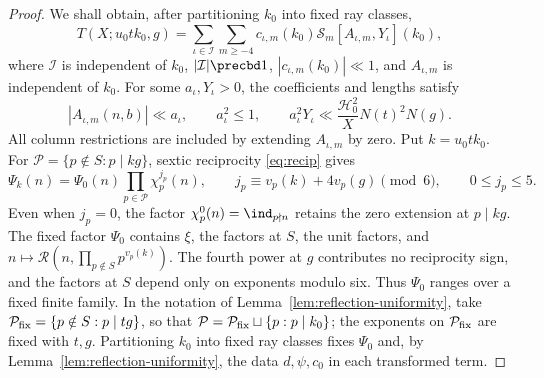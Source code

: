 \begin{proof}
We shall obtain, after partitioning $k_0$ into fixed ray classes,
\[
 T(X;u_0tk_0,g)
 =\sum_{\iota\in\mathcal I}\sum_{m\ge-4}
 c_{\iota,m}(k_0)\mathscr S_m[A_{\iota,m},Y_\iota](k_0),
\]
where $\mathcal I$ is independent of $k_0$, $|\mathcal I|\precbd1$,
$|c_{\iota,m}(k_0)|\ll1$, and $A_{\iota,m}$ is independent of $k_0$.
For some $a_\iota,Y_\iota>0$, the coefficients and lengths satisfy
\begin{equation}\label{eq:auxiliary-conductor-bound}
 |A_{\iota,m}(n,b)|\ll a_\iota,\qquad
 a_\iota^2\le1,\qquad
 a_\iota^2Y_\iota\ll
 \frac{\mathcal H_0^2}{X}N(t)^2N(g).
\end{equation}
All column restrictions are included by extending $A_{\iota,m}$ by zero.
Put $k=u_0tk_0$. For $\mathcal P=\{p\notin S:p\mid kg\}$, sextic
reciprocity \eqref{eq:recip} gives
\begin{equation}\label{eq:theta-row-twist}
 \Psi_k(n)=\Psi_0(n)\prod_{p\in\mathcal P}\chi_p^{j_p}(n),
 \qquad j_p\equiv v_p(k)+4v_p(g)\pmod6,
 \qquad 0\le j_p\le5.
\end{equation}
Even when $j_p=0$, the factor $\chi_p^0(n)=\ind_{p\nmid n}$
retains the zero extension at $p\mid kg$. The fixed factor $\Psi_0$
contains $\xi$, the factors at $S$, the unit factors,
and $n\mapsto\mathcal R(n,\prod_{p\notin S}p^{v_p(k)})$.
The fourth power at $g$ contributes no reciprocity sign, and the
factors at $S$ depend only on exponents modulo six. Thus $\Psi_0$
ranges over a fixed finite family. In the notation of
Lemma~\ref{lem:reflection-uniformity}, take
$\mathcal P_{\rm fix}=\{p\notin S:p\mid tg\}$, so that
$\mathcal P=\mathcal P_{\rm fix}\sqcup\{p:p\mid k_0\}$;
the exponents on $\mathcal P_{\rm fix}$ are fixed with $t,g$.
Partitioning $k_0$ into fixed
ray classes fixes $\Psi_0$ and, by
Lemma~\ref{lem:reflection-uniformity},
the data $d,\psi,c_0$ in each transformed term.


\end{proof}
